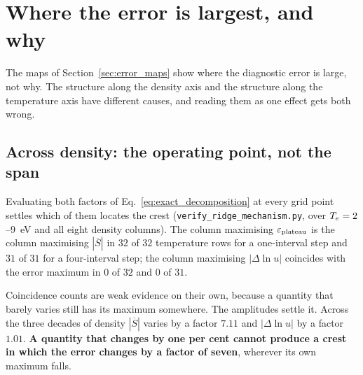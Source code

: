 \section{Where the error is largest, and why}
\label{sec:mechanism}

The maps of Section~\ref{sec:error_maps} show where the diagnostic error is
large, not why. The structure along the density axis and the structure along
the temperature axis have different causes, and reading them as one effect gets
both wrong.

\subsection{Across density: the operating point, not the span}
\label{sec:density_mechanism}

Evaluating both factors of Eq.~\eqref{eq:exact_decomposition} at every grid
point settles which of them locates the crest
(\texttt{verify\_ridge\_mechanism.py}, over $T_e = 2$--\SI{9}{\electronvolt}
and all eight density columns). The column maximising $\varepsilon_{\mathrm{plateau}}$ is the column
maximising $|\overline{S}|$ in $32$ of $32$ temperature rows for a one-interval
step and $31$ of $31$ for a four-interval step; the column maximising
$|\Delta\ln u|$ coincides with the error maximum in $0$ of $32$ and $0$ of $31$.

Coincidence counts are weak evidence on their own, because a quantity that
barely varies still has its maximum somewhere. The amplitudes settle it. Across
the three decades of density $|\overline{S}|$ varies by a factor $7.11$ and
$|\Delta\ln u|$ by a factor $1.01$. \textbf{A quantity that changes by one per
cent cannot produce a crest in which the error changes by a factor of seven},
wherever its own maximum falls.

